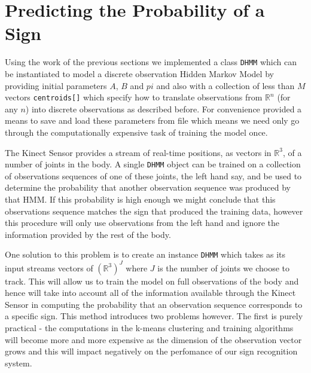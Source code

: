 \section{Predicting the Probability of a Sign}
Using the work of the previous sections we implemented a class \verb|DHMM| which can be instantiated to model a discrete observation Hidden Markov Model by providing initial parameters $A$, $B$ and $pi$ and also with a collection of less than $M$ vectors \verb|centroids[]| which specify how to translate observations from $\mathbb{R}^n$ (for any $n$) into discrete observations as described before. For convenience provided a means to save and load these parameters from file which means we need only go through the computationally expensive task of training the model once.

The Kinect Sensor provides a stream of real-time positions, as vectors in $\mathbb{R}^3$, of a number of joints in the body. A single \verb|DHMM| object can be trained on a collection of observations sequences of one of these joints, the left hand say, and be used to determine the probability that another observation sequence was produced by that HMM. If this probability is high enough we might conclude that this observations sequence matches the sign that produced the training data, however this procedure will only use observations from the left hand and ignore the information provided by the rest of the body.

One solution to this problem is to create an instance \verb|DHMM| which takes as its input streams vectors of $(\mathbb{R}^3)^J$ where $J$ is the number of joints we choose to track. This will allow us to train the model on full observations of the body and hence will take into account all of the information available through the Kinect Sensor in computing the probability that an observation sequence corresponds to a specific sign. This method introduces two problems however. The first is purely practical - the computations in the k-means clustering and training algorithms will become more and more expensive as the dimension of the observation vector grows and this will impact negatively on the perfomance of our sign recognition system.

